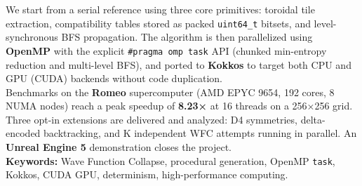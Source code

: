 \documentclass[a4paper,12pt]{report}
\begin{document}
We start from a serial reference using three core primitives: toroidal tile extraction, compatibility tables stored as packed \texttt{uint64\_t} bitsets, and level-synchronous BFS propagation. The algorithm is then parallelized using \textbf{OpenMP} with the explicit \texttt{\#pragma omp task} API (chunked min-entropy reduction and multi-level BFS), and ported to \textbf{Kokkos} to target both CPU and GPU (CUDA) backends without code duplication. \\

Benchmarks on the \textbf{Romeo} supercomputer (AMD EPYC 9654, 192 cores, 8 NUMA nodes) reach a peak speedup of \textbf{8.23×} at 16 threads on a 256×256 grid. Three opt-in extensions are delivered and analyzed: D4 symmetries, delta-encoded backtracking, and K independent WFC attempts running in parallel. An \textbf{Unreal Engine 5} demonstration closes the project. \\

\textbf{Keywords:} Wave Function Collapse, procedural generation, OpenMP \texttt{task}, Kokkos, CUDA GPU, determinism, high-performance computing. \\

\tableofcontents
\clearpage



















\end{document}
